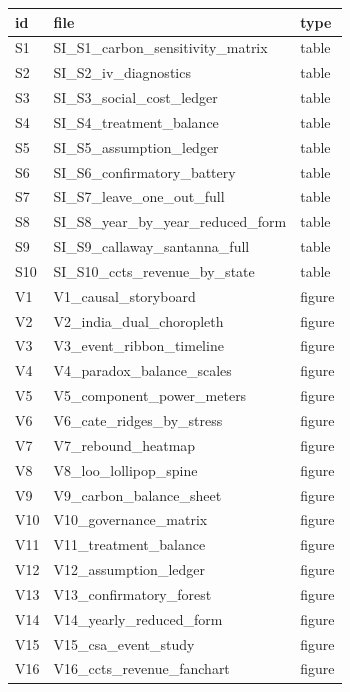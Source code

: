 \begin{tabular}{lll}
\toprule
id & file & type \\
\midrule
S1 & SI_S1_carbon_sensitivity_matrix & table \\
S2 & SI_S2_iv_diagnostics & table \\
S3 & SI_S3_social_cost_ledger & table \\
S4 & SI_S4_treatment_balance & table \\
S5 & SI_S5_assumption_ledger & table \\
S6 & SI_S6_confirmatory_battery & table \\
S7 & SI_S7_leave_one_out_full & table \\
S8 & SI_S8_year_by_year_reduced_form & table \\
S9 & SI_S9_callaway_santanna_full & table \\
S10 & SI_S10_ccts_revenue_by_state & table \\
V1 & V1_causal_storyboard & figure \\
V2 & V2_india_dual_choropleth & figure \\
V3 & V3_event_ribbon_timeline & figure \\
V4 & V4_paradox_balance_scales & figure \\
V5 & V5_component_power_meters & figure \\
V6 & V6_cate_ridges_by_stress & figure \\
V7 & V7_rebound_heatmap & figure \\
V8 & V8_loo_lollipop_spine & figure \\
V9 & V9_carbon_balance_sheet & figure \\
V10 & V10_governance_matrix & figure \\
V11 & V11_treatment_balance & figure \\
V12 & V12_assumption_ledger & figure \\
V13 & V13_confirmatory_forest & figure \\
V14 & V14_yearly_reduced_form & figure \\
V15 & V15_csa_event_study & figure \\
V16 & V16_ccts_revenue_fanchart & figure \\
\bottomrule
\end{tabular}
